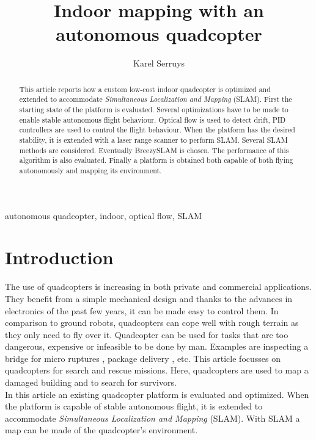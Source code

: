 \documentclass[twocolumn]{phdsymp} %
\begin{document}
\title{Indoor mapping with an autonomous quadcopter} %

\author{Karel Serruys}


\maketitle

\begin{abstract}
This article reports how a custom low-cost indoor quadcopter is optimized and extended to accommodate \textit{Simultaneous Localization and Mapping} (SLAM). First the starting state of the platform is evaluated. Several optimizations have to be made to enable stable autonomous flight behaviour. Optical flow is used to detect drift, PID controllers are used to control the flight behaviour. When the platform has the desired stability, it is extended with a laser range scanner to perform SLAM. Several SLAM methods are considered. Eventually BreezySLAM is chosen. The performance of this algorithm is also evaluated. Finally a platform is obtained both capable of both flying autonomously and mapping its environment.
\end{abstract}

\begin{keywords}
autonomous quadcopter, indoor, optical flow, SLAM
\end{keywords}

\section{Introduction}
The use of quadcopters is increasing in both private and commercial applications. They benefit from a simple mechanical design and thanks to the advances in electronics of the past few years, it can be made easy to control them. In comparison to ground robots, quadcopters can cope well with rough terrain as they only need to fly over it. Quadcopter can be used for tasks that are too dangerous, expensive or infeasible to be done by man. Examples are inspecting a bridge for micro ruptures \cite{paper:structureInspection2}, package delivery \cite{paper:deliveryQuad}, etc. This article focusses on quadcopters for search and rescue missions. Here, quadcopters are used to map a damaged building and to search for survivors.\\
In this article an existing quadcopter platform is evaluated and optimized. When the platform is capable of stable autonomous flight, it is extended to accommodate \textit{Simultaneous Localization and Mapping} (SLAM). With SLAM a map can be made of the quadcopter's environment.
\end{document}
